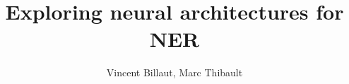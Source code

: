 \documentclass[final]{beamer}
\title{Exploring neural architectures for NER} %
\author{Vincent Billaut, Marc Thibault} %
\institute{CS224n, Stanford University, 03/21/2018} %
\newlength{\sepwid}
\newlength{\onecolwid}
\begin{document}

\setlength{\belowcaptionskip}{2ex} %
\setlength\belowdisplayshortskip{2ex} %

\begin{frame}[t] %

\begin{columns}[t] %

\begin{column}{\sepwid}\end{column} %

\begin{column}{\onecolwid} %







\end{column}
\end{columns}
\end{frame}
\end{document}
